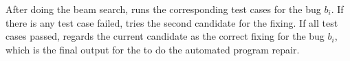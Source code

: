 After doing the beam search, \tool runs the corresponding test cases for the bug $b_i$. If there is any test case failed, \tool tries the second candidate for the fixing. If all test cases passed, \tool regards the current candidate as the correct fixing for the bug $b_i$, which is the final output for the \tool to do the automated program repair.